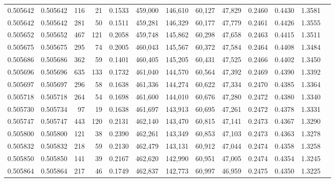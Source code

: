 \begin{tabular}{rrrrrrrrrrrrr}
0.505642 & 0.505642 &   116 &    21 &                                     0.1533 & 459,000 & 146,610 &  60,127 &  47,829 & 0.2460 & 0.4430 & 1.3581 \\
0.505642 & 0.505642 &   281 &    50 &                                     0.1511 & 459,281 & 146,329 &  60,177 &  47,779 & 0.2461 & 0.4426 & 1.3555 \\
0.505652 & 0.505652 &   467 &   121 &                                     0.2058 & 459,748 & 145,862 &  60,298 &  47,658 & 0.2463 & 0.4415 & 1.3511 \\
0.505675 & 0.505675 &   295 &    74 &                                     0.2005 & 460,043 & 145,567 &  60,372 &  47,584 & 0.2464 & 0.4408 & 1.3484 \\
0.505686 & 0.505686 &   362 &    59 &                                     0.1401 & 460,405 & 145,205 &  60,431 &  47,525 & 0.2466 & 0.4402 & 1.3450 \\
0.505696 & 0.505696 &   635 &   133 &                                     0.1732 & 461,040 & 144,570 &  60,564 &  47,392 & 0.2469 & 0.4390 & 1.3392 \\
0.505697 & 0.505697 &   296 &    58 &                                     0.1638 & 461,336 & 144,274 &  60,622 &  47,334 & 0.2470 & 0.4385 & 1.3364 \\
0.505718 & 0.505718 &   264 &    54 &                                     0.1698 & 461,600 & 144,010 &  60,676 &  47,280 & 0.2472 & 0.4380 & 1.3340 \\
0.505730 & 0.505734 &    97 &    19 &                                     0.1638 & 461,697 & 143,913 &  60,695 &  47,261 & 0.2472 & 0.4378 & 1.3331 \\
0.505747 & 0.505747 &   443 &   120 &                                     0.2131 & 462,140 & 143,470 &  60,815 &  47,141 & 0.2473 & 0.4367 & 1.3290 \\
0.505800 & 0.505800 &   121 &    38 &                                     0.2390 & 462,261 & 143,349 &  60,853 &  47,103 & 0.2473 & 0.4363 & 1.3278 \\
0.505832 & 0.505832 &   218 &    59 &                                     0.2130 & 462,479 & 143,131 &  60,912 &  47,044 & 0.2474 & 0.4358 & 1.3258 \\
0.505850 & 0.505850 &   141 &    39 &                                     0.2167 & 462,620 & 142,990 &  60,951 &  47,005 & 0.2474 & 0.4354 & 1.3245 \\
0.505864 & 0.505864 &   217 &    46 &                                     0.1749 & 462,837 & 142,773 &  60,997 &  46,959 & 0.2475 & 0.4350 & 1.3225 \\

\end{tabular}

